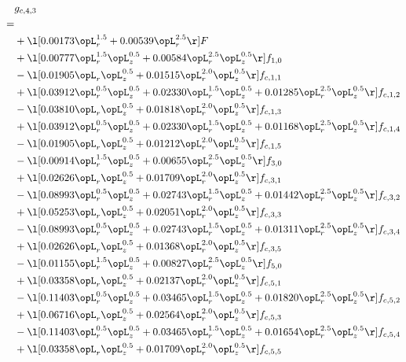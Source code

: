 \begin{alignat}{2} 
\label{eq:g_43_0} 
& g_{c,4,3} \nonumber \\ 
 = \\ 
& + \l[  0.00173 \opL_r^{1.5} +  0.00539 \opL_r^{2.5}  \r] F \nonumber \\ 
& + \l[  0.00777 \opL_r^{1.5} \opL_z^{0.5} +  0.00584 \opL_r^{2.5} \opL_z^{0.5}  \r] f_{1,0} \nonumber \\ 
& - \l[  0.01905 \opL_r \opL_z^{0.5} +  0.01515 \opL_r^{2.0} \opL_z^{0.5}  \r] f_{c,1,1} \nonumber \\ 
& + \l[  0.03912 \opL_r^{0.5} \opL_z^{0.5} +  0.02330 \opL_r^{1.5} \opL_z^{0.5} +  0.01285 \opL_r^{2.5} \opL_z^{0.5}  \r] f_{c,1,2} \nonumber \\ 
& - \l[  0.03810 \opL_r \opL_z^{0.5} +  0.01818 \opL_r^{2.0} \opL_z^{0.5}  \r] f_{c,1,3} \nonumber \\ 
& + \l[  0.03912 \opL_r^{0.5} \opL_z^{0.5} +  0.02330 \opL_r^{1.5} \opL_z^{0.5} +  0.01168 \opL_r^{2.5} \opL_z^{0.5}  \r] f_{c,1,4} \nonumber \\ 
& - \l[  0.01905 \opL_r \opL_z^{0.5} +  0.01212 \opL_r^{2.0} \opL_z^{0.5}  \r] f_{c,1,5} \nonumber \\ 
& - \l[  0.00914 \opL_r^{1.5} \opL_z^{0.5} +  0.00655 \opL_r^{2.5} \opL_z^{0.5}  \r] f_{3,0} \nonumber \\ 
& + \l[  0.02626 \opL_r \opL_z^{0.5} +  0.01709 \opL_r^{2.0} \opL_z^{0.5}  \r] f_{c,3,1} \nonumber \\ 
& - \l[  0.08993 \opL_r^{0.5} \opL_z^{0.5} +  0.02743 \opL_r^{1.5} \opL_z^{0.5} +  0.01442 \opL_r^{2.5} \opL_z^{0.5}  \r] f_{c,3,2} \nonumber \\ 
& + \l[  0.05253 \opL_r \opL_z^{0.5} +  0.02051 \opL_r^{2.0} \opL_z^{0.5}  \r] f_{c,3,3} \nonumber \\ 
& - \l[  0.08993 \opL_r^{0.5} \opL_z^{0.5} +  0.02743 \opL_r^{1.5} \opL_z^{0.5} +  0.01311 \opL_r^{2.5} \opL_z^{0.5}  \r] f_{c,3,4} \nonumber \\ 
& + \l[  0.02626 \opL_r \opL_z^{0.5} +  0.01368 \opL_r^{2.0} \opL_z^{0.5}  \r] f_{c,3,5} \nonumber \\ 
& - \l[  0.01155 \opL_r^{1.5} \opL_z^{0.5} +  0.00827 \opL_r^{2.5} \opL_z^{0.5}  \r] f_{5,0} \nonumber \\ 
& + \l[  0.03358 \opL_r \opL_z^{0.5} +  0.02137 \opL_r^{2.0} \opL_z^{0.5}  \r] f_{c,5,1} \nonumber \\ 
& - \l[  0.11403 \opL_r^{0.5} \opL_z^{0.5} +  0.03465 \opL_r^{1.5} \opL_z^{0.5} +  0.01820 \opL_r^{2.5} \opL_z^{0.5}  \r] f_{c,5,2} \nonumber \\ 
& + \l[  0.06716 \opL_r \opL_z^{0.5} +  0.02564 \opL_r^{2.0} \opL_z^{0.5}  \r] f_{c,5,3} \nonumber \\ 
& - \l[  0.11403 \opL_r^{0.5} \opL_z^{0.5} +  0.03465 \opL_r^{1.5} \opL_z^{0.5} +  0.01654 \opL_r^{2.5} \opL_z^{0.5}  \r] f_{c,5,4} \nonumber \\ 
& + \l[  0.03358 \opL_r \opL_z^{0.5} +  0.01709 \opL_r^{2.0} \opL_z^{0.5}  \r] f_{c,5,5} \nonumber \\ 
\end{alignat} 


